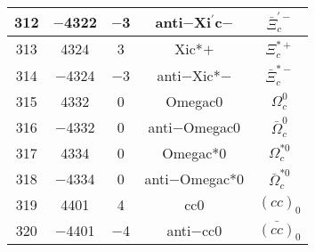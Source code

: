 \documentclass{article}
\begin{document}
\begin{table}[!htbp]
\begin{tabular}{|c|c|c|c|c|}
\hline
312 & $-$4322 & $-$3 & anti$-$Xi$^{\prime}$\underline{\hspace{0.6em}}c$-$ & $\bar{\Xi}_{c}^{\prime-}$ \\
\hline
313 & 4324 & 3 & Xi\underline{\hspace{0.6em}}c*$+$ & $\Xi_{c}^{*+}$ \\
\hline
314 & $-$4324 & $-$3 & anti$-$Xi\underline{\hspace{0.6em}}c*$-$ & $\bar{\Xi}_{c}^{*-}$ \\
\hline
315 & 4332 & 0 & Omega\underline{\hspace{0.6em}}c0 & $\Omega_{c}^{0}$ \\
\hline
316 & $-$4332 & 0 & anti$-$Omega\underline{\hspace{0.6em}}c0 & $\bar{\Omega}_{c}^{0}$ \\
\hline
317 & 4334 & 0 & Omega\underline{\hspace{0.6em}}c*0 & $\Omega_{c}^{*0}$ \\
\hline
318 & $-$4334 & 0 & anti$-$Omega\underline{\hspace{0.6em}}c*0 & $\bar{\Omega}_{c}^{*0}$ \\
\hline
319 & 4401 & 4 & cc\underline{\hspace{0.6em}}0 & $(cc)_{0}$ \\
\hline
320 & $-$4401 & $-$4 & anti$-$cc\underline{\hspace{0.6em}}0 & $\bar{(cc)}_{0}$ \\
\hline
\end{tabular}
\end{table}

\clearpage
\end{document}
